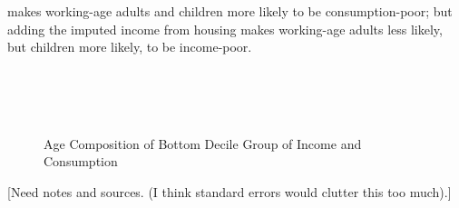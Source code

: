 makes working-age adults and children more likely to be consumption-poor; but adding the imputed income from housing makes working-age adults less likely, but children more likely, to be income-poor.

\begin{figure}
\caption{Age Composition of Bottom Decile Group of Income and Consumption}
\centering
	 \\
	 \\
	 \\
\label{fig:age_comp}
\end{figure}

[Need notes and sources. (I think standard errors would clutter this too much).]

